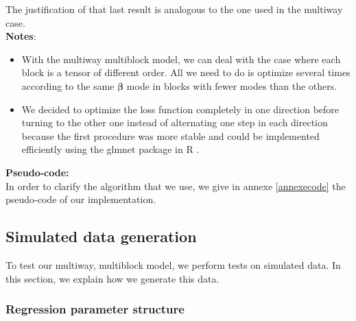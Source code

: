 \documentclass[preprint,12pt]{elsarticle}
\begin{document}
\noindent The justification of that last result is analogous to the one used in the multiway case.\\[2 pt]

\noindent \textbf{Notes}:
\begin{itemize}
    \item With the multiway multiblock model, we can deal with the case where each block is a tensor of different order. All we need to do is optimize several times according to the same $\bm{\beta}$ mode in blocks with fewer modes than the others.
    \item We decided to optimize the loss function completely in one direction before turning to the other one instead of alternating one step in each direction because the first procedure was more stable and could be implemented efficiently using the glmnet package in R \cite{glmnet}.
\end{itemize}

\vspace{7 pt}

{\fontsize{12}{8}\selectfont \noindent \textbf{Pseudo-code:}}\\[1 pt]
In order to clarify the algorithm that we use, we give in annexe \ref{annexecode} the pseudo-code of our implementation. 

\subsection{Simulated data generation}

To test our multiway, multiblock model, we perform tests on simulated data. In this section, we explain how we generate this data.
\subsubsection{Regression parameter structure}
\end{document}
